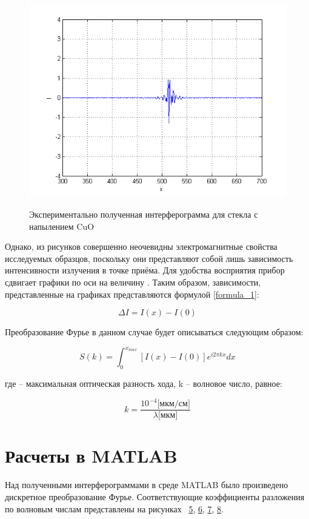 \documentclass[a4paper,12pt]{article} %
\begin{document}

    \begin{figure}[h!]
        \centering
        \includegraphics[width=0.48\linewidth]{4.png}
        \label{picture_4}
        \caption{Экспериментально полученная интерферограмма для стекла с напылением CuO}
    \end{figure}

    Однако, из рисунков совершенно неочевидны электромагнитные свойства исследуемых образцов, 
    поскольку они представляют собой лишь зависимость интенсивности излучения в точке приёма. 
    Для удобства восприятия прибор сдвигает графики по оси  на величину . 
    Таким образом, зависимости, представленные на графиках представляются формулой \eqref{formula_1}:

    \begin{equation} \label{formula_1}
        \Delta I = I(x) - I(0)
    \end{equation}

    Преобразование Фурье в данном случае будет описываться следующим образом:

    \begin{equation}
        S(k) = \int^{x_{max}}_{0} [I(x) - I(0)] e^{i 2 \pi kx} dx
    \end{equation}

    где – максимальная оптическая разность хода, k – волновое число, равное:

    \begin{equation}
        k = \frac{10^{-4} \text{[мкм/см]}}{\lambda \text{[мкм]}}
    \end{equation}

    \section{Расчеты в MATLAB}

    Над полученными интерферограммами в среде MATLAB было произведено дискретное преобразование Фурье. 
    Соответствующие коэффициенты разложения по волновым числам представлены на рисунках 
    \hyperref[picture_5]{5}, \hyperref[picture_6]{6}, \hyperref[picture_7]{7}, \hyperref[picture_8]{8}.
\end{document}
